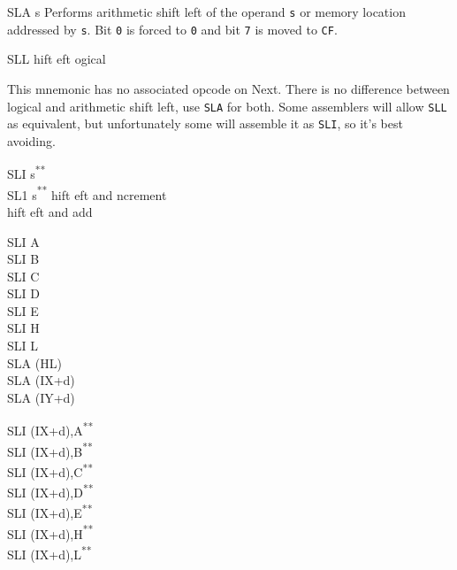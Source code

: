 \documentclass[12pt,twoside,openright,a4paper]{book}
\newcommand{\UNDOC}{\textnormal{\textsuperscript{**}}}
\begin{document}
\begin{basedescript}{
	\desclabelstyle{\multilinelabel}
	\desclabelwidth{3cm}}
\begin{DetailItem}{SLA s}
		Performs arithmetic shift left of the operand {\tt s} or memory location addressed by {\tt s}. Bit {\tt 0} is forced to {\tt 0} and bit {\tt 7} is moved to {\tt CF}.

		\begin{DetailEffects}[p]
			\FlagsSLAr
		\end{DetailEffects}
						
		\begin{DetailTiming}
		\end{DetailTiming}

	\end{DetailItem}

	\begin{DetailItem}{SLL}
		{hift \IH{L}eft ogical}
		{}

		This mnemonic has no associated opcode on Next. There is no difference between logical and arithmetic shift left, use {\tt SLA} for both. Some assemblers will allow {\tt SLL} as equivalent, but unfortunately some will assemble it as {\tt SLI}, so it's best avoiding.
		
	\end{DetailItem}

	\pagebreak
	\begin{DetailItem}{SLI s\UNDOC\\SL1 s\UNDOC}
		{hift eft and ncrement\\
		hift eft and add }
		{}
		
		\begin{DetailVariants}
			SLI A\\
			SLI B\\
			SLI C\\
			SLI D\\
			SLI E\\
			SLI H\\
			SLI L\\
			SLA (HL)\\
			SLA (IX+d)\\
			SLA (IY+d)

			\columnbreak
			SLI (IX+d),A\UNDOC\\
			SLI (IX+d),B\UNDOC\\
			SLI (IX+d),C\UNDOC\\
			SLI (IX+d),D\UNDOC\\
			SLI (IX+d),E\UNDOC\\
			SLI (IX+d),H\UNDOC\\
			SLI (IX+d),L\UNDOC


\end{DetailVariants}
\end{DetailItem}
\end{basedescript}
\end{document}
